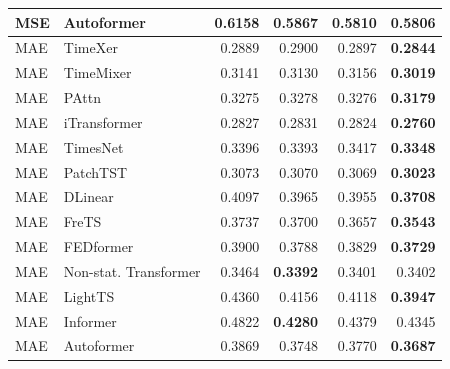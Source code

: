 \begin{longtable}{llrrrr}
MSE & Autoformer & 0.6158 & 0.5867 & 0.5810 & \textbf{0.5806} \\
\midrule
MAE & TimeXer & 0.2889 & 0.2900 & 0.2897 & \textbf{0.2844} \\
MAE & TimeMixer & 0.3141 & 0.3130 & 0.3156 & \textbf{0.3019} \\
MAE & PAttn & 0.3275 & 0.3278 & 0.3276 & \textbf{0.3179} \\
MAE & iTransformer & 0.2827 & 0.2831 & 0.2824 & \textbf{0.2760} \\
MAE & TimesNet & 0.3396 & 0.3393 & 0.3417 & \textbf{0.3348} \\
MAE & PatchTST & 0.3073 & 0.3070 & 0.3069 & \textbf{0.3023} \\
MAE & DLinear & 0.4097 & 0.3965 & 0.3955 & \textbf{0.3708} \\
MAE & FreTS & 0.3737 & 0.3700 & 0.3657 & \textbf{0.3543} \\
MAE & FEDformer & 0.3900 & 0.3788 & 0.3829 & \textbf{0.3729} \\
MAE & Non-stat. Transformer & 0.3464 & \textbf{0.3392} & 0.3401 & 0.3402 \\
MAE & LightTS & 0.4360 & 0.4156 & 0.4118 & \textbf{0.3947} \\
MAE & Informer & 0.4822 & \textbf{0.4280} & 0.4379 & 0.4345 \\
MAE & Autoformer & 0.3869 & 0.3748 & 0.3770 & \textbf{0.3687} \\
\end{longtable}
\endgroup

